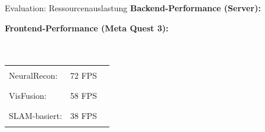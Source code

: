 \begin{frame}{Evaluation: Ressourcenauslastung}{}
    \textbf{Backend-Performance (Server):}
    \begin{table}[h]
        \centering
    \end{table}
    
    \vfill
    
    \textbf{Frontend-Performance (Meta Quest 3):}\\\\\\
    \begin{tabular}{l@{\hskip 0.5cm}r@{\hskip 0.5cm}l}
        NeuralRecon:  & 72 FPS & \textcolor{green!70!black}{\rule{3.6cm}{0.3cm}} \\[0.4em]
        VisFusion:    & 58 FPS & \textcolor{orange!80!black}{\rule{2.9cm}{0.3cm}} \\[0.4em]
        SLAM-basiert: & 38 FPS & \textcolor{red!70!black}{\rule{1.9cm}{0.3cm}}
    \end{tabular}
\end{frame}

